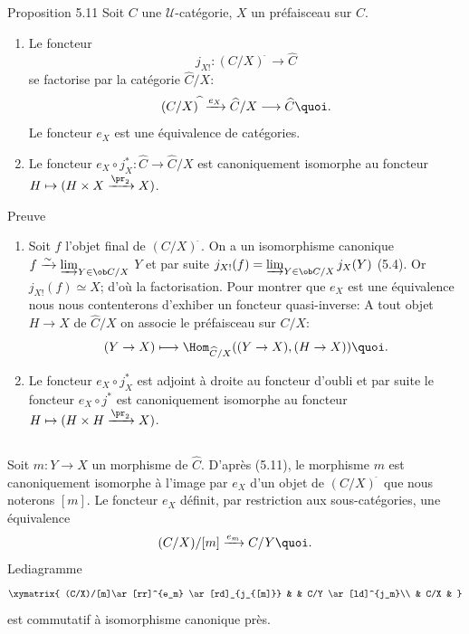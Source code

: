 \begin{enonce*}{Proposition 5.11}
Soit $C$ une $𝒰$-catégorie, $X$ un préfaisceau sur $C$.
\begin{enumerate}
\renewcommand{\labelenumi}{\theenumi)}
\item Le foncteur
$$
j_{X!}:(C/X)^{\widehat{\phantom{,}}}\longrightarrow
\widehat{C}
$$
se factorise par la catégorie $\widehat{C}/X$:
$$
(C/X)^{\widehat{\phantom{,}}}\xrightarrow{e_X}
\widehat{C}/X\longrightarrow
\widehat{C}{\quoi}.
$$
Le foncteur $e_X$ est une équivalence de catégories.

\item Le foncteur $e_{X}\circ j^\ast_X:\widehat{C}
\to  \widehat{C}/X$ est canoniquement isomorphe au
foncteur
  $H\mapsto (H\times X \xrightarrow{\pr_2} X)$.
\end{enumerate}
\end{enonce*}

\begin{enonce*}[remark]{Preuve}
\begin{enumerate}
\renewcommand{\labelenumi}{\theenumi)}
\item Soit $f$ l'objet final de $(C/X)^{\widehat{\phantom{,}}}$. On a
  un isomorphisme canonique $f\xrightarrow{\sim} \varinjlim_{Y\in
  \ob C/X}$ $Y$ et par suite $j_{X!}(f)=\varinjlim_{Y\in
  \ob C/X} j_X(Y)$ (5.4). Or $j_{X!}(f)\simeq X$; d'où la
  factorisation. Pour montrer que $e_X$ est une équivalence nous
  nous contenterons d'exhiber un foncteur quasi-inverse: A tout objet
  $H\rightarrow X$ de $\widehat{C}/X$ on associe le
  préfaisceau sur $C/X$:
$$
(Y\rightarrow X)\longmapsto
  \Hom_{\widehat{C}/X}((Y\rightarrow X), (H\rightarrow
  X)){\quoi}.
$$

\item Le foncteur $e_X\circ j^\ast_X$ est adjoint à droite au
  foncteur d'oubli et par suite le foncteur $e_X\circ j^\ast$ est
  canoniquement isomorphe au foncteur $H\mapsto (H\times
  H\xrightarrow{\pr_2}X)$.
\end{enumerate}
\end{enonce*}

\setcounter{subsection}{11}
\subsection{}
Soit $m:Y\rightarrow X$ un morphisme de $\widehat{C}$.
D'après (5.11), le morphisme $m$ est canoniquement isomorphe à
l'image par $e_X$ d'un objet de $(C/X)^{\widehat{\phantom{,}}}$ que
nous noterons $[m]$. Le foncteur $e_X$ définit, par restriction aux
sous-catégories, une équivalence
$$
(C/X)/[m]\xrightarrow{e_m}C/Y{\quoi}.
$$
Le\pageoriginale diagramme
\[
\xymatrix{
  (C/X)/[m]\ar[rr]^{e_m} \ar[rd]_{j_{[m]}} &       & C/Y \ar[ld]^{j_m}\\
          & C/X   &
}
\]
est commutatif à isomorphisme canonique près.

